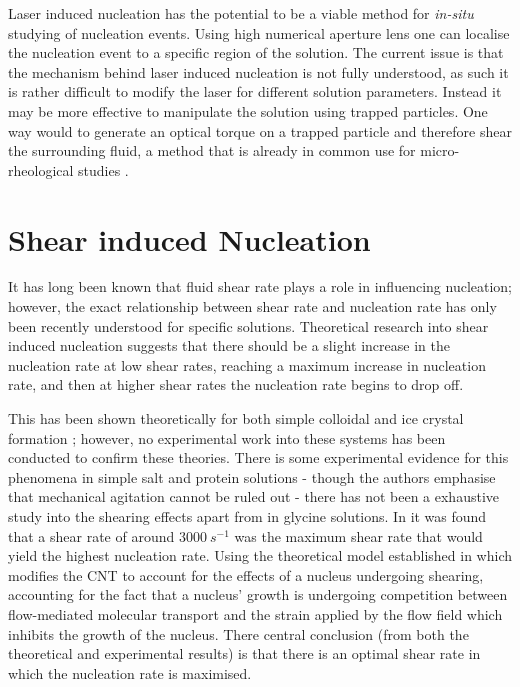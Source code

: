 Laser induced nucleation has the potential to be a viable method 
for \textit{in-situ} studying of nucleation events. Using high 
numerical aperture lens one can localise the nucleation event 
to a specific region of the solution. The current issue is that 
the mechanism behind laser induced nucleation is not fully 
understood, as such it is rather difficult to modify the laser 
for different solution parameters. Instead it may be more 
effective to manipulate the solution using trapped particles. 
One way would to generate an optical torque on a trapped particle
and therefore shear the surrounding fluid, a method that is 
already in common use for micro-rheological studies \cite{Bishop2004, 
RobertsonAnderson2018}. 

\section{Shear induced Nucleation}
It has long been known that fluid shear rate plays a role in 
influencing nucleation; however, the exact relationship between 
shear rate and nucleation rate has only been recently understood 
for specific solutions. Theoretical research into shear induced 
nucleation suggests that there should be a slight increase in the 
nucleation rate at low shear rates, reaching a maximum increase in 
nucleation rate, and then at higher shear rates the nucleation rate 
begins to drop off. 

This has been shown theoretically for both simple colloidal 
\cite{Mura2016,Debuysschere2023,Richard2015} and ice crystal 
formation \cite{Goswami2020}; however, no experimental work 
into these systems has been conducted to confirm these theories. 
There is some experimental evidence for this phenomena in simple 
salt and protein solutions - though the authors emphasise that 
mechanical agitation cannot be ruled out - there has not been a 
exhaustive study into the shearing effects apart from in glycine 
solutions. In \cite{Debuysschere2023} it was found that a shear 
rate of around $3000\ s^{-1}$ was the maximum shear rate that 
would yield the highest nucleation rate. Using the theoretical 
model established in \cite{Mura2016,2001} which modifies the CNT 
to account for the effects of a nucleus undergoing shearing, 
accounting for the fact that a nucleus' growth is undergoing 
competition between flow-mediated molecular transport and the 
strain applied by the flow field which inhibits the growth of 
the nucleus. There central conclusion (from both the theoretical 
and experimental results) is that there is an optimal shear rate 
in which the nucleation rate is maximised. 

